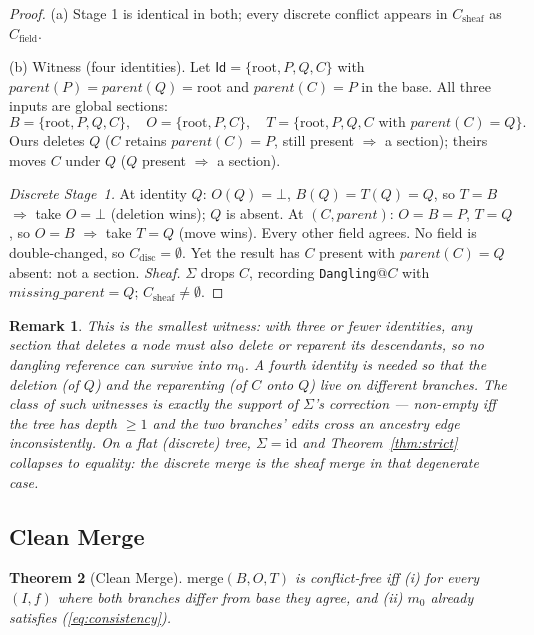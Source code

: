 \documentclass[11pt,a4paper]{article}
\newtheorem{theorem}{Theorem}
\newtheorem{remark}[theorem]{Remark}
\newcommand{\Id}{\mathsf{Id}}
\begin{document}
\begin{proof}
(a) Stage 1 is identical in both; every discrete conflict appears in
$C_{\text{sheaf}}$ as $C_{\text{field}}$.

(b) Witness (four identities). Let $\Id = \{\text{root}, P, Q, C\}$ with
$parent(P){=}parent(Q){=}\text{root}$ and $parent(C){=}P$ in the base. All
three inputs are global sections:
\[
B = \{\text{root}, P, Q, C\},\quad
O = \{\text{root}, P, C\},\quad
T = \{\text{root}, P, Q, C\text{ with } parent(C){=}Q\}.
\]
Ours deletes $Q$ ($C$ retains $parent(C){=}P$, still present $\Rightarrow$ a
section); theirs moves $C$ under $Q$ ($Q$ present $\Rightarrow$ a section).

\emph{Discrete Stage~1.} At identity $Q$: $O(Q){=}\bot$,
$B(Q){=}T(Q){=}Q$, so $T{=}B$ $\Rightarrow$ take $O{=}\bot$ (deletion wins);
$Q$ is absent. At $(C,parent)$: $O{=}B{=}P$, $T{=}Q$, so $O{=}B$
$\Rightarrow$ take $T{=}Q$ (move wins). Every other field agrees. No field
is double-changed, so $C_{\text{disc}} = \emptyset$. Yet the result has $C$
present with $parent(C){=}Q$ absent: not a section.
\emph{Sheaf.} $\Sigma$ drops $C$, recording \texttt{Dangling}@$C$ with
$\mathit{missing\_parent}{=}Q$; $C_{\text{sheaf}} \neq \emptyset$.
\end{proof}

\begin{remark}
This is the smallest witness: with three or fewer identities, any section
that deletes a node must also delete or reparent its descendants, so no
dangling reference can survive into $m_0$. A fourth identity is needed so
that the deletion (of $Q$) and the reparenting (of $C$ onto $Q$) live on
different branches. The class of such witnesses is exactly the support of
$\Sigma$'s correction --- non-empty iff the tree has depth $\geq 1$ and the
two branches' edits cross an ancestry edge inconsistently. On a flat
(discrete) tree, $\Sigma = \mathrm{id}$ and Theorem~\ref{thm:strict}
collapses to equality: the discrete merge \emph{is} the sheaf merge in that
degenerate case.
\end{remark}

\subsection{Clean Merge}

\begin{theorem}[Clean Merge]
$\mathrm{merge}(B,O,T)$ is conflict-free iff (i) for every $(I,f)$ where
both branches differ from base they agree, and (ii) $m_0$ already satisfies
(\ref{eq:consistency}).
\end{theorem}
\end{document}
